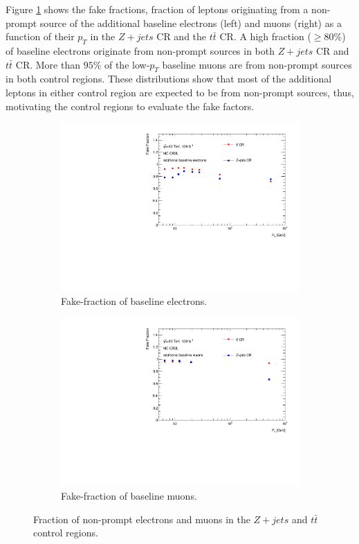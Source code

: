 Figure \ref{fig:FakeFractionBaseline} shows the fake fractions, fraction of leptons originating from a non-prompt source of the additional baseline electrons (left) and muons (right) as a function of their $p_{T}$ in the $Z+jets$ CR and the $t\bar{t}$ CR. A high fraction ($\geq 80\%$) of baseline electrons originate from non-prompt sources in both $Z+jets$ CR and $t\bar{t}$ CR. More than $95\%$ of the low-$p_{T}$ baseline muons are from non-prompt sources in both control regions. These distributions show that most of the additional leptons in either control region are expected to be from non-prompt sources, thus,  motivating the control regions to evaluate the fake factors.

\begin{figure}[!htb]
    \begin{subfigure}{.48\textwidth}
        \centering
        \includegraphics[width=.9\linewidth]{figures/Analysis/Background/FakeFractionBaselineElectrons.pdf}
        \caption{Fake-fraction of baseline electrons.}
    \end{subfigure}
    \begin{subfigure}{.48\textwidth}
        \centering
        \includegraphics[width=.9\linewidth]{figures/Analysis/Background/FakeFractionBaselineMuons.pdf}
        \caption{Fake-fraction of baseline muons.}
    \end{subfigure}
        \caption{Fraction of non-prompt electrons and muons in the $Z+jets$ and $t\bar{t}$ control regions. \label{fig:FakeFractionBaseline}}
\end{figure}

